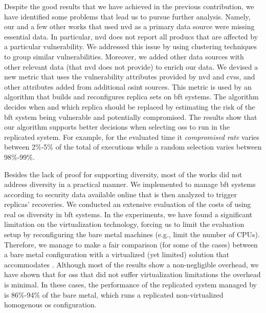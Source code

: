 Despite the good results that we have achieved in the previous contribution, we have identified some problems that lead us to pursue further analysis.
Namely, our and a few other works that used \gls{nvd} as a primary data source were missing essential data. 
In particular, \gls{nvd} does not report all producs that are affected by a particular vulnerability.
We addressed this issue by using clustering techniques to group similar vulnerabilities.
Moreover, we added other data sources with other relevant data (that \gls{nvd} does not provide) to enrich our data.
We devised a new metric that uses the vulnerability attributes provided by \gls{nvd} and \gls{cvss}, and other attributes added from additional \gls{osint} sources. 
This metric is used by an algorithm that builds and reconfigures replica sets on \gls{bft} systems.
The algorithm decides when and which replica should be replaced by estimating the risk of the \gls{bft} system being vulnerable and potentially compromised.
The results show that our algorithm supports better decisions when selecting \glspl{os} to run in the replicated system. 
For example, for the evaluated time it \emph{compromised rate} varies between 2\%-5\% of the total of executions while a random selection varies between 98\%-99\%.
 

Besides the lack of proof for supporting diversity, most of the works did not address diversity in a practical manner.
We implemented \system to manage \gls{bft} systems according to security data available online that is then analyzed to trigger replicas' recoveries.
We conducted an extensive evaluation of the costs of using real \gls{os} diversity in \gls{bft} systems.
In the experiments, we have found a significant limitation on the virtualization technology, forcing us to limit the evaluation setup by reconfiguring the bare metal machines (e.g., limit the number of CPUs).
Therefore, we manage to make a fair comparison (for some of the cases) between a bare metal configuration with a virtualized (yet limited) solution that accommodates \system.
Although most of the results show a non-negligible overhead, we have shown that for \glspl{os} that did not suffer virtualization limitations the overhead is minimal.
In these cases, the performance of the replicated system managed by \system is 86\%-94\% of the bare metal, which runs a replicated non-virtualized homogenous \gls{os} configuration.

